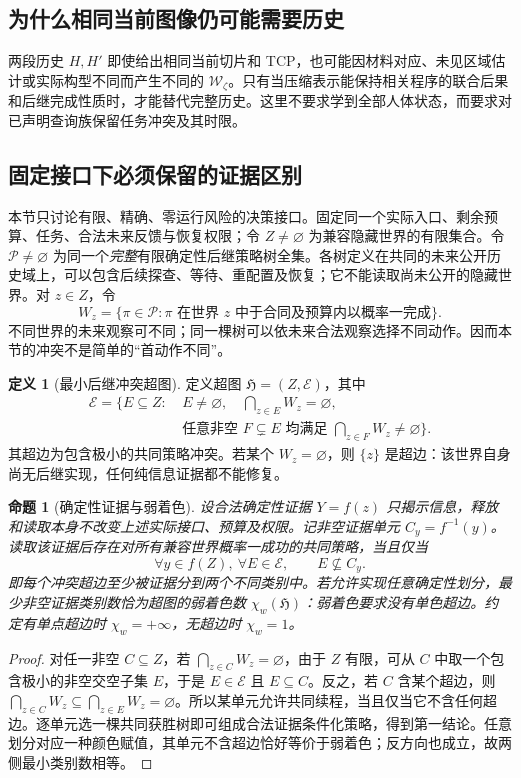 \documentclass[11pt,a4paper,fontset=fandol]{ctexart}
\newtheorem{proposition}[theorem]{命题}
\theoremstyle{definition}
\newtheorem{definition}[theorem]{定义}
\theoremstyle{remark}\newtheorem{remark}[theorem]{说明}
\numberwithin{equation}{section}
\begin{document}
\subsection{为什么相同当前图像仍可能需要历史}
两段历史 $H,H'$ 即使给出相同当前切片和 TCP，也可能因材料对应、未见区域估计或实际构型不同而产生不同的 $\mathcal W_\zeta$。只有当压缩表示能保持相关程序的联合后果和后继完成性质时，才能替代完整历史。这里不要求学到全部人体状态，而要求对已声明查询族保留任务冲突及其时限。


\subsection{固定接口下必须保留的证据区别}
本节只讨论有限、精确、零运行风险的决策接口。固定同一个实际入口、剩余预算、任务、合法未来反馈与恢复权限；令 $Z\ne\varnothing$ 为兼容隐藏世界的有限集合。令 $\mathcal P\ne\varnothing$ 为同一个\emph{完整}有限确定性后继策略树全集。各树定义在共同的未来公开历史域上，可以包含后续探查、等待、重配置及恢复；它不能读取尚未公开的隐藏世界。对 $z\in Z$，令
\[
 W_z=\{\pi\in\mathcal P:\pi\text{ 在世界 }z\text{ 中于合同及预算内以概率一完成}\}.
\]
不同世界的未来观察可不同；同一棵树可以依未来合法观察选择不同动作。因而本节的冲突不是简单的“首动作不同”。

\begin{definition}[最小后继冲突超图]
定义超图 $\mathfrak H=(Z,\mathcal E)$，其中
\[
 \begin{aligned}
 \mathcal E=\bigl\{E\subseteq Z:\ &E\ne\varnothing,\quad
 \bigcap_{z\in E}W_z=\varnothing,\\
 &\text{任意非空 }F\subsetneq E\text{ 均满足 }
 \bigcap_{z\in F}W_z\ne\varnothing\bigr\}.
 \end{aligned}
\]
其超边为包含极小的共同策略冲突。若某个 $W_z=\varnothing$，则 $\{z\}$ 是超边：该世界自身尚无后继实现，任何纯信息证据都不能修复。
\end{definition}

\begin{proposition}[确定性证据与弱着色]
\label{prop:evidence_hypergraph}
设合法确定性证据 $Y=f(z)$ 只揭示信息，释放和读取本身不改变上述实际接口、预算及权限。记非空证据单元 $C_y=f^{-1}(y)$。读取该证据后存在对所有兼容世界概率一成功的共同策略，当且仅当
\[
 \forall y\in f(Z),\ \forall E\in\mathcal E,\qquad E\nsubseteq C_y.
\]
即每个冲突超边至少被证据分到两个不同类别中。若允许实现任意确定性划分，最少非空证据类别数恰为超图的弱着色数 $\chi_w(\mathfrak H)$：弱着色要求没有单色超边。约定有单点超边时 $\chi_w=+\infty$，无超边时 $\chi_w=1$。
\end{proposition}
\begin{proof}
对任一非空 $C\subseteq Z$，若 $\bigcap_{z\in C}W_z=\varnothing$，由于 $Z$ 有限，可从 $C$ 中取一个包含极小的非空交空子集 $E$，于是 $E\in\mathcal E$ 且 $E\subseteq C$。反之，若 $C$ 含某个超边，则 $\bigcap_{z\in C}W_z\subseteq\bigcap_{z\in E}W_z=\varnothing$。所以某单元允许共同续程，当且仅当它不含任何超边。逐单元选一棵共同获胜树即可组成合法证据条件化策略，得到第一结论。任意划分对应一种颜色赋值，其单元不含超边恰好等价于弱着色；反方向也成立，故两侧最小类别数相等。
\end{proof}
\end{document}
